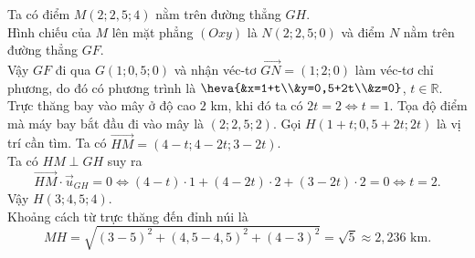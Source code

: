 \begin{ex}
{\begin{itemchoice}
			\itemch Ta có điểm $M\left(2;2,5;4\right)$ nằm trên đường thẳng $GH$.\\ 
			Hình chiếu của $M$ lên mặt phẳng $(Oxy)$ là $N(2;2,5;0)$ và điểm $N$ nằm trên đường thẳng $GF$.\\
			Vậy $GF$  đi qua $G(1;0,5;0)$ và nhận véc-tơ $\vec{GN}=(1;2;0)$ làm véc-tơ chỉ phương, do đó có phương trình là $\heva{&x=1+t\\&y=0,5+2t\\&z=0}$, $t\in \mathbb{R}$.
			\itemch Trực thăng bay vào mây ở độ cao $2$ km, khi đó ta có 
			$2t=2 \Leftrightarrow t=1$. Tọa độ điểm mà máy bay bắt đầu đi vào mây là $(2;2{,}5;2)$.
			\itemch Gọi $H(1+t; 0,5+2t;2t)$ là vị trí cần tìm. Ta có $\vec{HM}=(4-t; 4-2t; 3-2t)$. \\
			Ta có $HM \perp GH$ suy ra $$\vec{HM}\cdot \vec{u}_{GH} = 0 \Leftrightarrow (4-t)\cdot 1 + (4-2t)\cdot 2 + (3-2t) \cdot 2 =0 \Leftrightarrow t=2.$$
			Vậy $H(3;4,5;4)$.\\
			Khoảng cách từ trực thăng đến đỉnh núi là $$MH = \sqrt{(3-5)^2+(4,5-4,5)^2+(4-3)^2} =\sqrt{5} \approx 2,236 \text{ km.}$$ 
			\itemch  
			\begin{center}
			\end{center}
		\end{itemchoice}
	}
\end{ex}

